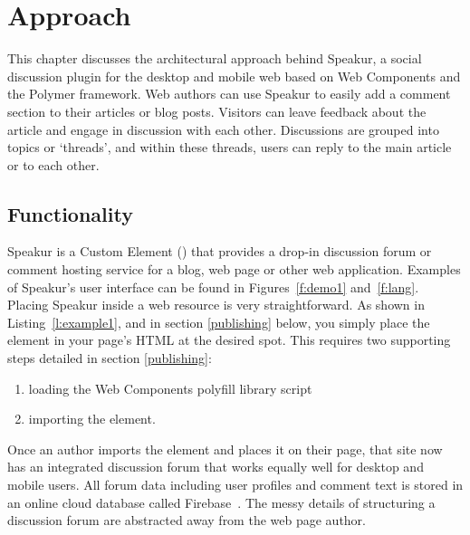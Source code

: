 \chapter{Approach}
%
\label{ch:approach}

This chapter discusses the architectural approach behind Speakur, 
a social discussion plugin for the desktop and mobile web based on Web Components and the Polymer framework.
Web authors can use Speakur to easily add a comment section to their articles or blog posts.
Visitors can leave feedback about the article and engage in discussion with each other.
Discussions are grouped into topics or `threads', and within these threads, users can reply to the main article or to each other.

\section{Functionality}
Speakur 
is a Custom Element 
() 
that provides a drop-in discussion forum or comment hosting service for a blog, web page or other web application.
Examples of Speakur's user interface can be found in Figures~\ref{f:demo1} and~\ref{f:lang}.
Placing Speakur inside a web resource is very straightforward.
As shown in Listing~\ref{l:example1},
and in section \ref{publishing} below,
you simply place the 
 element in your page's HTML at the desired spot.
This requires two supporting steps detailed in section \ref{publishing}:
\begin{enumerate}
\item loading the Web Components polyfill library script
\item importing the  element.
\end{enumerate}

Once an author imports the element and places it on their page, that site now has an integrated discussion forum that works equally well for desktop and mobile users. 
All forum data including user profiles and comment text is stored in an online cloud database called Firebase~\cite{firebasecontributors2015}.
The messy details of structuring a discussion forum are abstracted away from the web page author.

